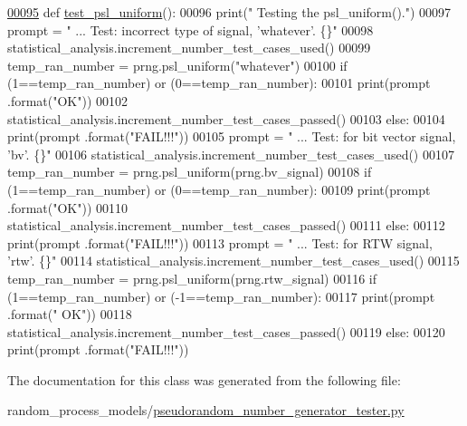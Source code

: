 \begin{DoxyCode}
\hypertarget{classrandom__process__models_1_1pseudorandom__number__generator__tester_1_1prng__tester_l00095}{}\hyperlink{classrandom__process__models_1_1pseudorandom__number__generator__tester_1_1prng__tester_a5597ea984257dcd64376064fda82385d}{00095}     \textcolor{keyword}{def }\hyperlink{classrandom__process__models_1_1pseudorandom__number__generator__tester_1_1prng__tester_a5597ea984257dcd64376064fda82385d}{test\_psl\_uniform}():
00096         print(\textcolor{stringliteral}{" Testing the psl\_uniform()."})
00097         prompt = \textcolor{stringliteral}{"  ... Test: incorrect type of signal, 'whatever'.     \{\}"}
00098         statistical\_analysis.increment\_number\_test\_cases\_used()
00099         temp\_ran\_number = prng.psl\_uniform(\textcolor{stringliteral}{"whatever"})
00100         \textcolor{keywordflow}{if} (1==temp\_ran\_number) \textcolor{keywordflow}{or} (0==temp\_ran\_number):
00101             print(prompt .format(\textcolor{stringliteral}{"OK"}))
00102             statistical\_analysis.increment\_number\_test\_cases\_passed()
00103         \textcolor{keywordflow}{else}:
00104             print(prompt .format(\textcolor{stringliteral}{"FAIL!!!"}))
00105         prompt = \textcolor{stringliteral}{"  ... Test: for bit vector signal, 'bv'.          \{\}"}
00106         statistical\_analysis.increment\_number\_test\_cases\_used()
00107         temp\_ran\_number = prng.psl\_uniform(prng.bv\_signal)
00108         \textcolor{keywordflow}{if} (1==temp\_ran\_number) \textcolor{keywordflow}{or} (0==temp\_ran\_number):
00109             print(prompt .format(\textcolor{stringliteral}{"OK"}))
00110             statistical\_analysis.increment\_number\_test\_cases\_passed()
00111         \textcolor{keywordflow}{else}:
00112             print(prompt .format(\textcolor{stringliteral}{"FAIL!!!"}))
00113         prompt = \textcolor{stringliteral}{"  ... Test: for RTW signal, 'rtw'.        \{\}"}
00114         statistical\_analysis.increment\_number\_test\_cases\_used()
00115         temp\_ran\_number = prng.psl\_uniform(prng.rtw\_signal)
00116         \textcolor{keywordflow}{if} (1==temp\_ran\_number) \textcolor{keywordflow}{or} (-1==temp\_ran\_number):
00117             print(prompt .format(\textcolor{stringliteral}{"  OK"}))
00118             statistical\_analysis.increment\_number\_test\_cases\_passed()
00119         \textcolor{keywordflow}{else}:
00120             print(prompt .format(\textcolor{stringliteral}{"FAIL!!!"}))
\end{DoxyCode}


The documentation for this class was generated from the following file\+:\begin{DoxyCompactItemize}
\item 
random\+\_\+process\+\_\+models/\hyperlink{pseudorandom__number__generator__tester_8py}{pseudorandom\+\_\+number\+\_\+generator\+\_\+tester.\+py}\end{DoxyCompactItemize}

